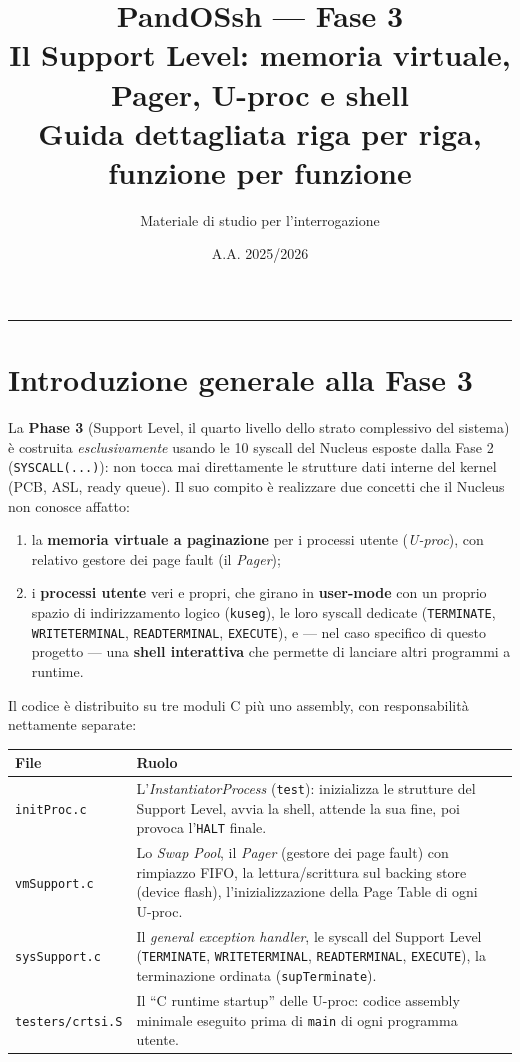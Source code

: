 \documentclass[11pt,a4paper]{article}
\title{\textbf{PandOSsh --- Fase 3}\\[2pt]
\large Il Support Level: memoria virtuale, Pager, U-proc e shell\\
\normalsize Guida dettagliata riga per riga, funzione per funzione}
\author{Materiale di studio per l'interrogazione}
\date{A.A. 2025/2026}
\newcommand{\code}[1]{\texttt{#1}}
\begin{document}
\maketitle
\tableofcontents
\bigskip
\hrule
\bigskip

\section{Introduzione generale alla Fase 3}

La \textbf{Phase 3} (Support Level, il quarto livello dello strato
complessivo del sistema) è costruita \emph{esclusivamente} usando le 10
syscall del Nucleus esposte dalla Fase 2 (\code{SYSCALL(...)}): non tocca
mai direttamente le strutture dati interne del kernel (PCB, ASL, ready
queue). Il suo compito è realizzare due concetti che il Nucleus non conosce
affatto:

\begin{enumerate}
\item la \textbf{memoria virtuale a paginazione} per i processi utente
  (\emph{U-proc}), con relativo gestore dei page fault (il \emph{Pager});
\item i \textbf{processi utente} veri e propri, che girano in
  \textbf{user-mode} con un proprio spazio di indirizzamento logico
  (\code{kuseg}), le loro syscall dedicate (\code{TERMINATE},
  \code{WRITETERMINAL}, \code{READTERMINAL}, \code{EXECUTE}), e --- nel caso
  specifico di questo progetto --- una \textbf{shell interattiva} che
  permette di lanciare altri programmi a runtime.
\end{enumerate}

Il codice è distribuito su tre moduli C più uno assembly, con
responsabilità nettamente separate:
\begin{center}
\begin{tabular}{@{}llp{7.7cm}@{}}
\toprule
\textbf{File} & \textbf{Ruolo} \\
\midrule
\code{initProc.c} & L'\emph{InstantiatorProcess} (\code{test}): inizializza
  le strutture del Support Level, avvia la shell, attende la sua fine, poi
  provoca l'\code{HALT} finale. \\
\code{vmSupport.c} & Lo \emph{Swap Pool}, il \emph{Pager} (gestore dei page
  fault) con rimpiazzo FIFO, la lettura/scrittura sul backing store
  (device flash), l'inizializzazione della Page Table di ogni U-proc. \\
\code{sysSupport.c} & Il \emph{general exception handler}, le syscall del
  Support Level (\code{TERMINATE}, \code{WRITETERMINAL}, \code{READTERMINAL},
  \code{EXECUTE}), la terminazione ordinata (\code{supTerminate}). \\
\code{testers/crtsi.S} & Il ``C runtime startup'' delle U-proc: codice
  assembly minimale eseguito prima di \code{main} di ogni programma utente. \\
\bottomrule
\end{tabular}
\end{center}
\end{document}
